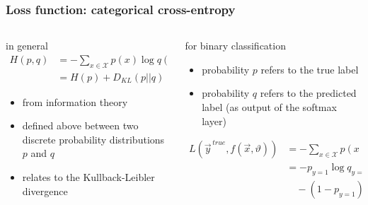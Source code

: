 \documentclass[
  aspectratio=1610, %
  intlimits %
]{beamer}
\begin{document}
\begin{frame}
 \frametitle{Loss function: categorical cross-entropy}

 \begin{columns}
 \begin{column}{.49\textwidth}
 \begin{exampleblock}{in general}
   \begin{align*}
     H(p, q) &= - \sum_{x \in \mathcal{X}} p(x) \log q(x)\\
             &= H(p) + D_{KL}(p || q)
 \end{align*}
   \begin{itemize}
   \item from information theory
   \item defined above between two discrete probability distributions $p$ and $q$
   \item relates to the Kullback-Leibler divergence
   \end{itemize}
 \end{exampleblock}
\end{column}

 \begin{column}{.49\textwidth}
 \begin{exampleblock}{for binary classification}
   \begin{itemize}
   \item probability $p$ refers to the true label
   \item probability $q$ refers to the predicted label (as output of the softmax layer)
 \end{itemize}
 
   \begin{align*}
 L( \vec{y}^{\,true}, f(\vec{x}, \vartheta)) &= - \sum_{x \in \mathcal{X}} p(x) \log q(x) \\
                                             &= - p_{y=1} \log q_{\hat{y}=1} \\
                                               &\quad - (1-p_{y=1}) \log (1-q_{\hat{y}=1})
   \end{align*}
   
\end{exampleblock}

\end{column}
\end{columns}


\end{frame}
\end{document}
